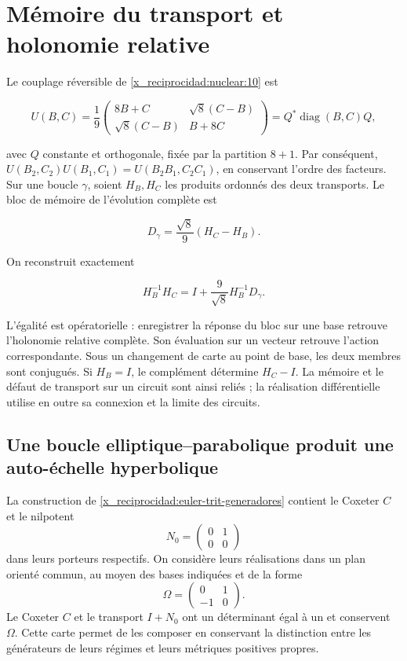 \section{Mémoire du transport et holonomie relative}

Le couplage réversible de \cref{x_reciprocidad:nuclear:10} est



\[
U(B,C)=\frac19
\begin{pmatrix}8B+C&\sqrt8(C-B)\\
\sqrt8(C-B)&B+8C\end{pmatrix}
=Q^*\operatorname{diag}(B,C)Q,
\]



avec \(Q\) constante et orthogonale, fixée par la partition \(8+1\).
Par conséquent,
\(U(B_2,C_2)U(B_1,C_1)=U(B_2B_1,C_2C_1)\),
en conservant l’ordre des facteurs.
Sur une boucle \(\gamma\), soient \(H_B,H_C\) les produits
ordonnés des deux transports.
Le bloc de mémoire de l’évolution complète est



\[
D_\gamma=\frac{\sqrt8}{9}(H_C-H_B).
\]



On reconstruit exactement



\begin{equation}
\boxed{H_B^{-1}H_C=I+\frac9{\sqrt8}H_B^{-1}D_\gamma.}
\label{x_reciprocidad:nuc11:eq:25}
\end{equation}



L’égalité est opératorielle : enregistrer la réponse du bloc
sur une base retrouve l’holonomie relative complète.
Son évaluation sur un vecteur retrouve l’action correspondante.
Sous un changement de carte au point de base, les deux membres sont conjugués.
Si \(H_B=I\), le complément détermine \(H_C-I\).
La mémoire et le défaut de transport sur un circuit sont ainsi reliés ;
la réalisation différentielle utilise en outre
sa connexion et la limite des circuits.

\subsection{Une boucle elliptique–parabolique produit une auto-échelle hyperbolique}

La construction de \cref{x_reciprocidad:euler-trit-generadores} contient le
Coxeter \(C\) et le nilpotent
\[
 N_0=\begin{pmatrix}0&1\\0&0\end{pmatrix}
\]
dans leurs porteurs respectifs.
On considère leurs réalisations dans un plan orienté commun,
au moyen des bases indiquées et de la forme
\[
 \Omega=\begin{pmatrix}0&1\\-1&0\end{pmatrix}.
\]
Le Coxeter \(C\) et le transport \(I+N_0\) ont un déterminant
égal à un et conservent \(\Omega\).
Cette carte permet de les composer en conservant la distinction entre
les générateurs de leurs régimes et leurs métriques positives propres.


